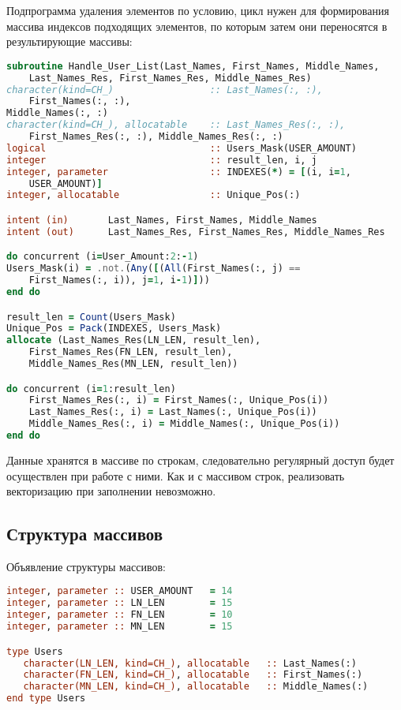 \documentclass[a4paper,12pt]{article}
\begin{document}
Подпрограмма удаления элементов по условию, цикл нужен для формирования массива индексов подходящих элементов, по которым затем они переносятся в результирующие массивы:
\begin{lstlisting}[language=Fortran]
subroutine Handle_User_List(Last_Names, First_Names, Middle_Names, 
	Last_Names_Res, First_Names_Res, Middle_Names_Res)
character(kind=CH_)                 :: Last_Names(:, :), 
	First_Names(:, :), 
Middle_Names(:, :)
character(kind=CH_), allocatable    :: Last_Names_Res(:, :), 
	First_Names_Res(:, :), Middle_Names_Res(:, :)
logical                             :: Users_Mask(USER_AMOUNT)
integer                             :: result_len, i, j
integer, parameter                  :: INDEXES(*) = [(i, i=1, 
	USER_AMOUNT)]
integer, allocatable                :: Unique_Pos(:)

intent (in)       Last_Names, First_Names, Middle_Names
intent (out)      Last_Names_Res, First_Names_Res, Middle_Names_Res

do concurrent (i=User_Amount:2:-1)
Users_Mask(i) = .not.(Any([(All(First_Names(:, j) == 
	First_Names(:, i)), j=1, i-1)]))
end do

result_len = Count(Users_Mask)
Unique_Pos = Pack(INDEXES, Users_Mask)
allocate (Last_Names_Res(LN_LEN, result_len), 
	First_Names_Res(FN_LEN, result_len), 
	Middle_Names_Res(MN_LEN, result_len))

do concurrent (i=1:result_len)
	First_Names_Res(:, i) = First_Names(:, Unique_Pos(i))
	Last_Names_Res(:, i) = Last_Names(:, Unique_Pos(i))
	Middle_Names_Res(:, i) = Middle_Names(:, Unique_Pos(i))
end do
\end{lstlisting}

Данные хранятся в массиве по строкам, следовательно регулярный доступ будет осуществлен при работе с ними. Как и с массивом строк, реализовать векторизацию при заполнении невозможно.

\subsection{Структура массивов}
Объявление структуры массивов:
\begin{lstlisting}[language=Fortran]
integer, parameter :: USER_AMOUNT   = 14
integer, parameter :: LN_LEN        = 15
integer, parameter :: FN_LEN        = 10
integer, parameter :: MN_LEN        = 15

type Users
   character(LN_LEN, kind=CH_), allocatable   :: Last_Names(:)
   character(FN_LEN, kind=CH_), allocatable   :: First_Names(:)
   character(MN_LEN, kind=CH_), allocatable   :: Middle_Names(:)
end type Users
\end{lstlisting}
\end{document}
